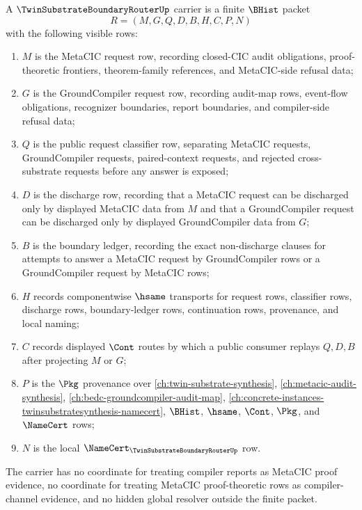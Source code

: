\begin{definition}
\label{def:twin-substrate-boundary-router-carrier}
A $\TwinSubstrateBoundaryRouterUp$ carrier is a finite $\BHist$ packet
$$
R=(M,G,Q,D,B,H,C,P,N)
$$
with the following visible rows:
\begin{enumerate}
\item $M$ is the MetaCIC request row, recording closed-CIC audit obligations, proof-theoretic frontiers, theorem-family references, and MetaCIC-side refusal data;
\item $G$ is the GroundCompiler request row, recording audit-map rows, event-flow obligations, recognizer boundaries, report boundaries, and compiler-side refusal data;
\item $Q$ is the public request classifier row, separating MetaCIC requests, GroundCompiler requests, paired-context requests, and rejected cross-substrate requests before any answer is exposed;
\item $D$ is the discharge row, recording that a MetaCIC request can be discharged only by displayed MetaCIC data from $M$ and that a GroundCompiler request can be discharged only by displayed GroundCompiler data from $G$;
\item $B$ is the boundary ledger, recording the exact non-discharge clauses for attempts to answer a MetaCIC request by GroundCompiler rows or a GroundCompiler request by MetaCIC rows;
\item $H$ records componentwise $\hsame$ transports for request rows, classifier rows, discharge rows, boundary-ledger rows, continuation rows, provenance, and local naming;
\item $C$ records displayed $\Cont$ routes by which a public consumer replays $Q,D,B$ after projecting $M$ or $G$;
\item $P$ is the $\Pkg$ provenance over \autoref{ch:twin-substrate-synthesis}, \autoref{ch:metacic-audit-synthesis}, \autoref{ch:bedc-groundcompiler-audit-map}, \autoref{ch:concrete-instances-twinsubstratesynthesis-namecert}, $\BHist$, $\hsame$, $\Cont$, $\Pkg$, and $\NameCert$ rows;
\item $N$ is the local $\NameCert_{\TwinSubstrateBoundaryRouterUp}$ row.
\end{enumerate}
The carrier has no coordinate for treating compiler reports as MetaCIC proof evidence, no coordinate for treating MetaCIC proof-theoretic rows as compiler-channel evidence, and no hidden global resolver outside the finite packet.
\end{definition}

